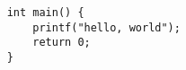 \documentclass{article}
\begin{document}
\begin{verbatim}
    int main() {
        printf("hello, world");
        return 0;
    }
\end{verbatim}
\end{document}
